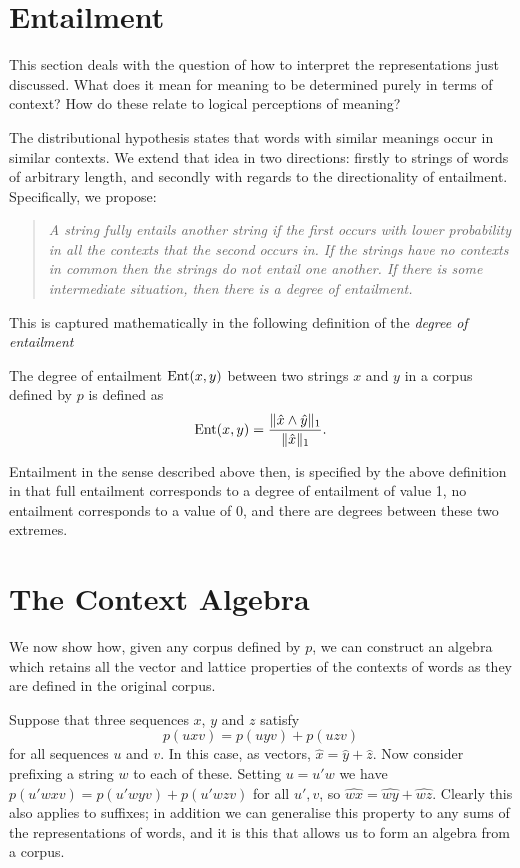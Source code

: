 \documentclass[12pt]{report}
\begin{document}


\section{Entailment}

This section deals with the question of how to interpret the representations just discussed. What does it mean for meaning to be determined purely in terms of context? How do these relate to logical perceptions of meaning?

The distributional hypothesis states that words with similar meanings occur in similar contexts. We extend that idea in two directions: firstly to strings of words of arbitrary length, and secondly with regards to the directionality of entailment. Specifically, we propose:
\begin{quote}
\emph{A string fully entails another string if the first occurs with lower probability in all the contexts that the second occurs in. If the strings have no contexts in common then the strings do not entail one another. If there is some intermediate situation, then there is a \emph{degree} of entailment.}
\end{quote}
This is captured mathematically in the following definition of the \emph{degree of entailment}
\begin{defn}
The degree of entailment $\operatorname{Ent}(x,y)$ between two strings $x$ and $y$ in a corpus defined by $p$ is defined as
$$\operatorname{Ent}(x,y) = \frac{\|\hat{x}\land\hat{y}\|_1}{\|\hat{x}\|_1}.$$
\end{defn}
Entailment in the sense described above then, is specified by the above definition in that full entailment corresponds to a degree of entailment of value 1, no entailment corresponds to a value of 0, and there are degrees between these two extremes.

\section{The Context Algebra}

We now show how, given any corpus defined by $p$, we can construct an algebra which retains all the vector and lattice properties of the contexts of words as they are defined in the original corpus.

Suppose that three sequences $x$, $y$ and $z$ satisfy
$$p(uxv) = p(uyv) + p(uzv)$$
for all sequences $u$ and $v$. In this case, as vectors, $\hat{x} = \hat{y} + \hat{z}$. Now consider prefixing a string $w$ to each of these. Setting $u = u'w$ we have $p(u'wxv) = p(u'wyv) + p(u'wzv)$ for all $u',v$, so $\widehat{wx} = \widehat{wy} + \widehat{wz}$. Clearly this also applies to suffixes; in addition we can generalise this property to any sums of the representations of words, and it is this that allows us to form an algebra from a corpus.
\end{document}
